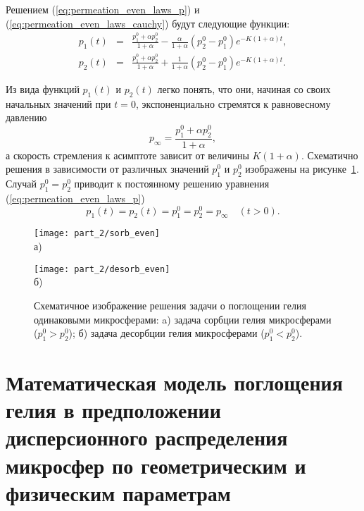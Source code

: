 Решением (\ref{eq:permeation_even_laws_p}) и (\ref{eq:permeation_even_laws_cauchy}) будут следующие функции:
\begin{eqnarray}
\label{eq:permeation_even_p1}
p_1(t) & = & \frac{p_1^0 + \alpha p_2^0}{1+\alpha} - \frac{\alpha}{1+\alpha}(p_2^0-p_1^0)e^{-K(1+\alpha)t}, \\
\label{eq:permeation_even_p2}
p_2(t) & = & \frac{p_1^0 + \alpha p_2^0}{1+\alpha} + \frac{1}{1+\alpha}(p_2^0-p_1^0)e^{-K(1+\alpha)t}.
\end{eqnarray}

Из вида функций $p_1(t)$ и $p_2(t)$ легко понять, что они, начиная со своих начальных значений при $t=0$, экспоненциально стремятся к равновесному давлению 
\begin{equation}
\label{eq:permeation_even_pinfty}
p_\infty=\displaystyle\frac{p_1^0 + \alpha p_2^0}{1+\alpha},
\end{equation}
а скорость стремления к асимптоте зависит от величины $K(1+\alpha)$. Схематично решения в зависимости от различных значений $p_1^0$ и $p_2^0$ изображены на рисунке~\ref{pic:permeation_even}. Случай $p_1^0=p_2^0$ приводит к постоянному решению уравнения (\ref{eq:permeation_even_laws_p}) 
\[
p_1(t)=p_2(t)=p_1^0=p_2^0=p_\infty\quad (t>0).
\]


\begin{figure}[ht] 
	\begin{minipage}[ht]{0.49\linewidth}\centering
			\texttt{[image: part\_2/sorb\_even]} \\ а)
	\end{minipage}
	\hfill
	\begin{minipage}[ht]{0.49\linewidth}\centering
		\texttt{[image: part\_2/desorb\_even]} \\ б)
	\end{minipage}

	\caption{Схематичное изображение решения задачи о поглощении гелия одинаковыми микросферами: a) задача сорбции гелия микросферами ($p_1^0>p_2^0$); б) задача десорбции гелия микросферами ($p_1^0<p_2^0$).}
	\label{pic:permeation_even}
\end{figure}




\section{Математическая модель поглощения гелия в предположении дисперсионного распределения микросфер по геометрическим и физическим параметрам}
\label{section_2_3}

